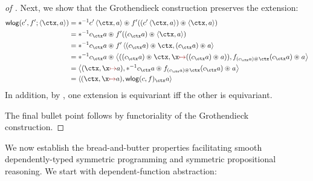 \begin{proof}[of ]
  Next, we show that the Grothendieck construction preserves the \WLOG
  extension:
  \begin{align*}
  \wlg(\canoniser', f'; \pair\ctx a) &=
  \inv*{\canoniser'\pair\ctx a} \act
    f'(\parent{\canoniser'\pair\ctx a}\act \pair\ctx a)
  \\&=
  \inv*{\canoniser_{\ctx} a} \act
    f'((\canoniser_{\ctx} a)\act \pair\ctx a)
  \\&=
  \inv*{\canoniser_{\ctx} a} \act
    f'\pair{(\canoniser_{\ctx} a)\act\ctx}{(\canoniser_{\ctx} a) \iact{} a}
  \\&=
  \inv*{\canoniser_{\ctx} a} \act
  \pair{\parent{(\canoniser_{\ctx} a)\act\ctx,
                  \For\x((\canoniser_{\ctx} a) \iact{} a)}}
       {f_{(\canoniser_{\ctx} a)\act\ctx}{(\canoniser_{\ctx} a) \iact{} a}}
  \\&=
  \pair{\parent{\ctx,
                  \For\x a}}
       {\inv*{\canoniser_{\ctx} a} \act
         f_{(\canoniser_{\ctx} a)\act\ctx}{(\canoniser_{\ctx} a) \iact{} a}}
  \\&=
  \pair{\parent{\ctx,
                  \For\x a}}
       {\wlg(\canoniser, f)_{\ctx}a}
  \end{align*}
  In addition, by , one \WLOG
  extension is equivariant iff the other is equivariant.

  The final bullet point follows by functoriality of the Grothendieck
  construction.
\end{proof}

We now establish the bread-and-butter properties facilitating smooth
dependently-typed symmetric programming and symmetric propositional
reasoning. We start with dependent-function abstraction:

